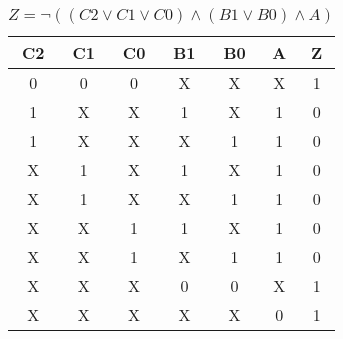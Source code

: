 
\begin{center}
    \begin{table}[h] \caption{\(Z = \lnot ((C2 \lor C1 \lor C0) \land (B1 \lor B0) \land A) \)}
        \begin{center}
            \begin{tabular}{|c|c|c|c|c|c||c|} \hline
            C2 & C1 & C0 & B1 & B0 & A & Z \\ \hline\hline
            0  & 0  & 0  & X  & X  & X & 1 \\ \hline
            1  & X  & X  & 1  & X  & 1 & 0 \\ \hline
            1  & X  & X  & X  & 1  & 1 & 0 \\ \hline
            X  & 1  & X  & 1  & X  & 1 & 0 \\ \hline
            X  & 1  & X  & X  & 1  & 1 & 0 \\ \hline
            X  & X  & 1  & 1  & X  & 1 & 0 \\ \hline
            X  & X  & 1  & X  & 1  & 1 & 0 \\ \hline
            X  & X  & X  & 0  & 0  & X & 1 \\ \hline
            X  & X  & X  & X  & X  & 0 & 1 \\ \hline
            \end{tabular}
        \end{center}
    \end{table}
\end{center}
